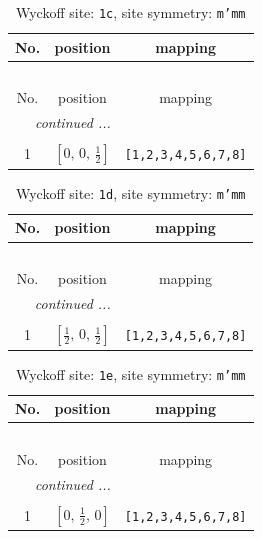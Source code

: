 \documentclass[fleqn,8pt]{jsarticle}
\begin{document}
\begin{longtable}{ccc}
\caption{Wyckoff site: {\tt 1c}, site symmetry: {\tt m'mm}}
 \\
 \hline \hline
No. & position & mapping \\ \hline \endfirsthead

\multicolumn{2}{l}{\tablename\ \thetable{}} \\
 \hline \hline
No. & position & mapping \\ \hline \endhead

 \hline \hline
\multicolumn{2}{r}{\footnotesize\it continued ...} \\ \endfoot

 \hline \hline
\multicolumn{2}{r}{} \\ \endlastfoot

1 & $\left[ 0,\, 0,\, \frac{1}{2} \right]$ & {\tt [1,2,3,4,5,6,7,8]} \\
\end{longtable}
\renewcommand{\arraystretch}{1.2}
\begin{longtable}{ccc}
\caption{Wyckoff site: {\tt 1d}, site symmetry: {\tt m'mm}}
 \\
 \hline \hline
No. & position & mapping \\ \hline \endfirsthead

\multicolumn{2}{l}{\tablename\ \thetable{}} \\
 \hline \hline
No. & position & mapping \\ \hline \endhead

 \hline \hline
\multicolumn{2}{r}{\footnotesize\it continued ...} \\ \endfoot

 \hline \hline
\multicolumn{2}{r}{} \\ \endlastfoot

1 & $\left[ \frac{1}{2},\, 0,\, \frac{1}{2} \right]$ & {\tt [1,2,3,4,5,6,7,8]} \\
\end{longtable}
\renewcommand{\arraystretch}{1.2}
\begin{longtable}{ccc}
\caption{Wyckoff site: {\tt 1e}, site symmetry: {\tt m'mm}}
 \\
 \hline \hline
No. & position & mapping \\ \hline \endfirsthead

\multicolumn{2}{l}{\tablename\ \thetable{}} \\
 \hline \hline
No. & position & mapping \\ \hline \endhead

 \hline \hline
\multicolumn{2}{r}{\footnotesize\it continued ...} \\ \endfoot

 \hline \hline
\multicolumn{2}{r}{} \\ \endlastfoot

1 & $\left[ 0,\, \frac{1}{2},\, 0 \right]$ & {\tt [1,2,3,4,5,6,7,8]} \\
\end{longtable}
\end{document}
